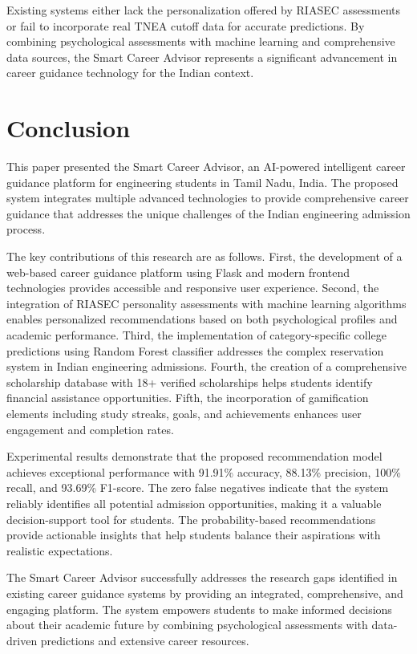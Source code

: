 \documentclass[journal]{IEEEtran}
\begin{document}
Existing systems either lack the personalization offered by RIASEC assessments or fail to incorporate real TNEA cutoff data for accurate predictions. By combining psychological assessments with machine learning and comprehensive data sources, the Smart Career Advisor represents a significant advancement in career guidance technology for the Indian context.

\section{Conclusion}

This paper presented the Smart Career Advisor, an AI-powered intelligent career guidance platform for engineering students in Tamil Nadu, India. The proposed system integrates multiple advanced technologies to provide comprehensive career guidance that addresses the unique challenges of the Indian engineering admission process.

The key contributions of this research are as follows. First, the development of a web-based career guidance platform using Flask and modern frontend technologies provides accessible and responsive user experience. Second, the integration of RIASEC personality assessments with machine learning algorithms enables personalized recommendations based on both psychological profiles and academic performance. Third, the implementation of category-specific college predictions using Random Forest classifier addresses the complex reservation system in Indian engineering admissions. Fourth, the creation of a comprehensive scholarship database with 18+ verified scholarships helps students identify financial assistance opportunities. Fifth, the incorporation of gamification elements including study streaks, goals, and achievements enhances user engagement and completion rates.

Experimental results demonstrate that the proposed recommendation model achieves exceptional performance with 91.91\% accuracy, 88.13\% precision, 100\% recall, and 93.69\% F1-score. The zero false negatives indicate that the system reliably identifies all potential admission opportunities, making it a valuable decision-support tool for students. The probability-based recommendations provide actionable insights that help students balance their aspirations with realistic expectations.

The Smart Career Advisor successfully addresses the research gaps identified in existing career guidance systems by providing an integrated, comprehensive, and engaging platform. The system empowers students to make informed decisions about their academic future by combining psychological assessments with data-driven predictions and extensive career resources.
\end{document}
